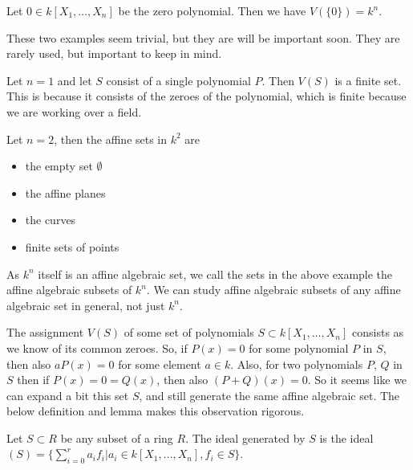 \begin{example}
Let $0\in k[X_1, \ldots, X_n]$ be the zero polynomial. Then we have $V(\{0\})=k^n$. 
\end{example}

These two examples seem trivial, but they are will be important soon. They are rarely used, but important to keep in mind. 

\begin{example}
Let $n=1$ and let $S$ consist of a single polynomial $P$. Then $V(S)$ is a finite set. This is because it consists of the zeroes of the polynomial, which is finite because we are working over a field. 
\end{example}

\begin{example}
Let $n=2$, then the affine sets in $k^2$ are
\begin{itemize}
    \item the empty set $\emptyset$
    \item the affine planes
    \item the curves
    \item finite sets of points
\end{itemize}
\end{example}

As $k^n$ itself is an affine algebraic set, we call the sets in the above example the affine algebraic subsets of $k^n$. We can study affine algebraic subsets of any affine algebraic set in general, not just $k^n$. 

The assignment $V(S)$ of some set of polynomials $S\subset k[X_1, \ldots, X_n]$ consists as we know of its common zeroes. So, if $P(x)=0$ for some polynomial $P$ in $S$, then also $aP(x)=0$ for some element $a\in k$. Also, for two polynomials $P$, $Q$ in $S$ then if $P(x)=0=Q(x)$, then also $(P+Q)(x)=0$. So it seems like we can expand a bit this set $S$, and still generate the same affine algebraic set. The below definition and lemma makes this observation rigorous. 

\begin{definition}
Let $S\subset R$ be any subset of a ring $R$. The ideal generated by $S$ is the ideal $(S)=\{ \sum_{i=0}^r a_i f_i \vert a_i \in k[X_1, \ldots, X_n], f_i\in S\}$. 
\end{definition}

